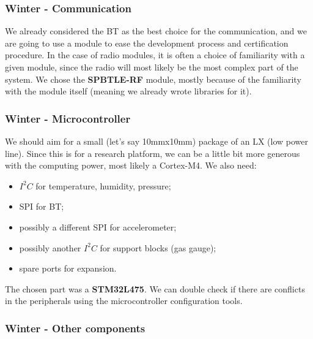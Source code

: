 \documentclass[11pt,xcolor=table,aspectratio=169]{beamer}
\begin{document}
	\begin{frame}
		\frametitle{Winter - Communication}
		We already considered the BT as the best choice for the communication, and we are going to use a module to ease the development process and certification procedure. In the case of radio modules, it is often a choice of familiarity with a given module, since the radio will most likely be the most complex part of the system.
		We chose the \textbf{SPBTLE-RF} module, mostly because of the familiarity with the module itself (meaning we already wrote libraries for it).	
	\end{frame}

	\begin{frame}
		\frametitle{Winter - Microcontroller}
		We should aim for a small (let's say 10\si{mm}x10\si{mm}) package of an LX (low power line). Since this is for a research platform, we can be a little bit more generous with the computing power, most likely a Cortex-M4. We also need:
		\begin{itemize}
			\item $I^2C$ for temperature, humidity, pressure;
			\item SPI for BT;
			\item possibly a different SPI for accelerometer;
			\item possibly another $I^2C$ for support blocks (gas gauge);
			\item spare ports for expansion.
		\end{itemize}
		The chosen part was a \textbf{STM32L475}. We can double check if there are conflicts in the peripherals using the microcontroller configuration tools.
	\end{frame}

	\begin{frame}
		\frametitle{Winter - Other components}
	\end{frame}
\end{document}
